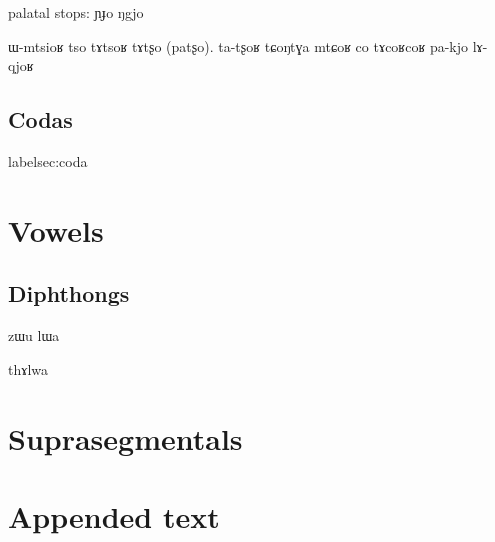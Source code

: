 \documentclass[oldfontcommands,oneside,a4paper,11pt]{article}
\newcommand{\ipa}[1]{{\phon #1}} %
\begin{document}
      
palatal stops:      
      \ipa{ɲɟo} \ipa{ŋgjo}
      
      ɯ-mtsioʁ
	tso tɤtsoʁ 
	tɤtʂo (patʂo). ta-tʂoʁ
 tɕoŋtɣa mtɕoʁ
 co tɤcoʁcoʁ
 pa-kjo
     lɤ-qjoʁ
      \subsection{Codas}label{sec:coda}
    
    
     \section{Vowels} \label{sec:vowels}
     
          \subsection{Diphthongs}
     zɯu
     lɯa
     
     thɤlwa
     
     \section{Suprasegmentals}
     
         
     \section{Appended text}


\end{document}
